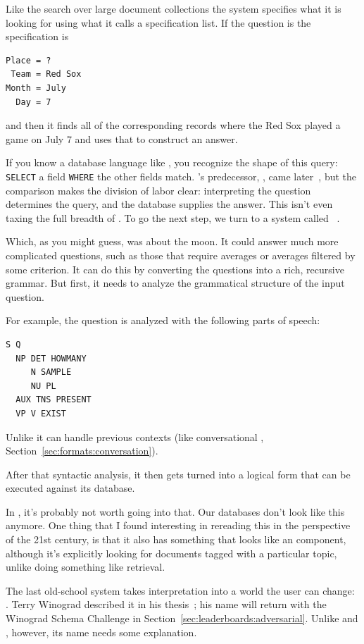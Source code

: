 Like the search over large document collections the 
system specifies what it is looking for using what it calls a
specification list.
%
If the question is 
the specification is
\begin{verbatim}
Place = ?
 Team = Red Sox
Month = July
  Day = 7
\end{verbatim}
and then it finds all of the corresponding records where the Red Sox
played a game on July 7 and uses that to construct an answer.

If you know a database language like , you recognize the shape
of this query: \texttt{SELECT} a field \texttt{WHERE} the other fields
match.  's predecessor, , came later~\citep{chamberlin-74},
but the comparison makes the division of labor clear: interpreting the
question determines the query, and the database supplies the answer.
%
This isn’t even taxing the full breadth
of .
%
To go the next step, we turn to a system called
~\citep{woods-71}.

Which, as you might guess, was about the moon.
%
It could answer much more complicated questions,
such as those that require averages or averages
%
filtered by some criterion.
%
It can do this by converting the questions
into a rich, recursive grammar.
%
But first, it needs to analyze the grammatical
structure of the input question.

For example, the question  is analyzed
with the following parts of speech:
\begin{verbatim}
S Q
  NP DET HOWMANY
     N SAMPLE
     NU PL
  AUX TNS PRESENT
  VP V EXIST
\end{verbatim}
%
Unlike  it can handle previous contexts (like
conversational , Section~\ref{sec:formats:conversation}).


After that syntactic analysis, it then gets
turned into a logical form that can be executed
%
against its database.

In \currentyear{}, it’s probably not worth going into
that.
%
Our databases don’t look like this anymore.
%
One thing that I found interesting in rereading
this in the perspective of the 21st century,
%
is that it also has something that looks like
an  component, although it’s explicitly
%
looking for documents tagged with a particular
topic, unlike doing something like \tfidf{}
%
retrieval.

The last old-school  system takes interpretation into a world the
user can change: .  Terry Winograd described it in his
thesis~\citep{winograd-71}; his name will return with the Winograd Schema
Challenge in Section~\ref{sec:leaderboards:adversarial}.  Unlike
 and , however, its name needs some explanation.

